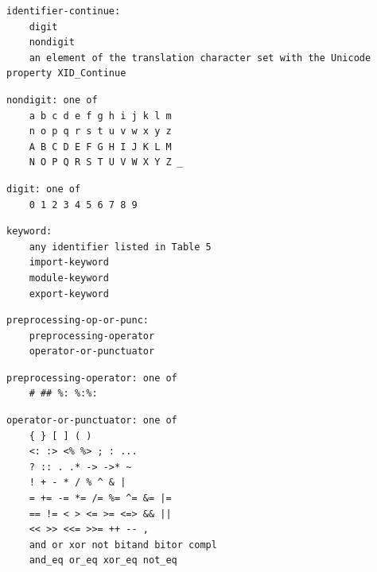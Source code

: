 \noindent\textbf{\texttt{}}\par
\begin{lstlisting}
identifier-continue:
    digit
    nondigit
    an element of the translation character set with the Unicode property XID_Continue
\end{lstlisting}

\noindent\textbf{\texttt{}}\par
\begin{lstlisting}
nondigit: one of
    a b c d e f g h i j k l m
    n o p q r s t u v w x y z
    A B C D E F G H I J K L M
    N O P Q R S T U V W X Y Z _
\end{lstlisting}

\noindent\textbf{\texttt{}}\par
\begin{lstlisting}
digit: one of
    0 1 2 3 4 5 6 7 8 9
\end{lstlisting}

\noindent\textbf{\texttt{}}\par
\begin{lstlisting}
keyword:
    any identifier listed in Table 5
    import-keyword
    module-keyword
    export-keyword
\end{lstlisting}

\noindent\textbf{\texttt{}}\par
\begin{lstlisting}
preprocessing-op-or-punc:
    preprocessing-operator
    operator-or-punctuator
\end{lstlisting}

\noindent\textbf{\texttt{}}\par
\begin{lstlisting}
preprocessing-operator: one of
    # ## %: %:%:
\end{lstlisting}

\noindent\textbf{\texttt{}}\par
\begin{lstlisting}
operator-or-punctuator: one of
    { } [ ] ( )
    <: :> <% %> ; : ...
    ? :: . .* -> ->* ~
    ! + - * / % ^ & |
    = += -= *= /= %= ^= &= |=
    == != < > <= >= <=> && ||
    << >> <<= >>= ++ -- ,
    and or xor not bitand bitor compl
    and_eq or_eq xor_eq not_eq
\end{lstlisting}

